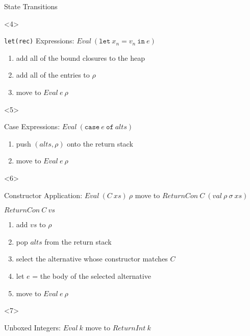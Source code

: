 \documentclass{beamer}
\begin{document}
\begin{frame}[fragile]{State Transitions}
  \begin{onlyenv}<4>
    \begin{block}{\texttt{let(rec)} Expressions:
        $Eval\ (\texttt{let}\ x_n = v_n\ \texttt{in}\ e)$}
      \begin{enumerate}
      \item add all of the bound closures to the heap
      \item add all of the entries to $\rho$
      \item move to $Eval\ e\ \rho$
      \end{enumerate}
    \end{block}
  \end{onlyenv}

  \begin{onlyenv}<5>
    \begin{block}{Case Expressions: $Eval\ (\texttt{case}\ e\ \texttt{of}\
        alts)$}
      \begin{enumerate}
      \item push $(alts,\rho)$ onto the return stack
      \item move to $Eval\ e\ \rho$
      \end{enumerate}
    \end{block}
  \end{onlyenv}

  \begin{onlyenv}<6>
    \begin{block}{Constructor Application: $Eval\ (C\ xs)\ \rho$}
      move to $ReturnCon\ C\ (val\ \rho\ \sigma\ xs)$
    \end{block}

    \begin{block}{$ReturnCon\ C\ vs$}
      \begin{enumerate}
      \item add $vs$ to $\rho$
      \item pop $alts$ from the return stack
      \item select the alternative whose constructor matches $C$
      \item let $e$ = the body of the selected alternative
      \item move to $Eval\ e\ \rho$
      \end{enumerate}
    \end{block}
  \end{onlyenv}

  \begin{onlyenv}<7>
    \begin{block}{Unboxed Integers: $Eval\ k$}
      move to $ReturnInt\ k$
    \end{block}


\end{onlyenv}
\end{frame}
\end{document}
